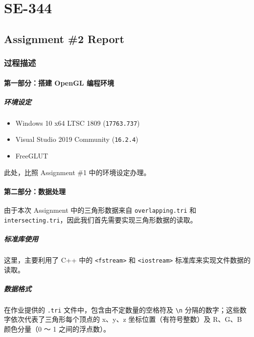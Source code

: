 \documentclass[
]{article}
\date{}
\begin{document}
\hypertarget{header-n0}{%
\section{SE-344}\label{header-n0}}

\hypertarget{header-n2}{%
\subsection{Assignment \#2 Report}\label{header-n2}}

\hypertarget{header-n10}{%
\subsubsection{过程描述}\label{header-n10}}

\hypertarget{header-n11}{%
\paragraph{第一部分：搭建 OpenGL 编程环境}\label{header-n11}}

\hypertarget{header-n12}{%
\subparagraph{环境设定}\label{header-n12}}

\begin{itemize}
\item
  Windows 10 x64 LTSC 1809 (\texttt{17763.737})
\item
  Visual Studio 2019 Community (\texttt{16.2.4})
\item
  FreeGLUT
\end{itemize}

此处，比照 Assignment \#1 中的环境设定办理。

\hypertarget{header-n21}{%
\paragraph{第二部分：数据处理}\label{header-n21}}

由于本次 Assignment 中的三角形数据来自 \texttt{overlapping.tri} 和
\texttt{intersecting.tri}，因此我们首先需要实现三角形数据的读取。

\hypertarget{header-n23}{%
\subparagraph{标准库使用}\label{header-n23}}

这里，主要利用了 C++ 中的 \texttt{\textless{}fstream\textgreater{}} 和
\texttt{\textless{}iostream\textgreater{}} 标准库来实现文件数据的读取。

\hypertarget{header-n25}{%
\subparagraph{数据格式}\label{header-n25}}

在作业提供的 \texttt{.tri} 文件中，包含由不定数量的空格符及
\texttt{\textquotesingle{}\textbackslash{}n\textquotesingle{}}
分隔的数字；这些数字依次代表了三角形每个顶点的 x、y、z
坐标位置（有符号整数）及 R、G、B 颜色分量（0 ～ 1 之间的浮点数）。
\end{document}
